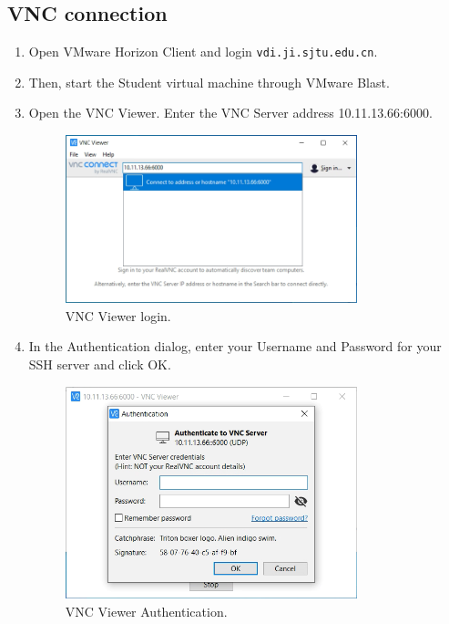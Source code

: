 \documentclass[a4paper,12pt,twoside]{article}
\begin{document}
\subsection{VNC connection}
\begin{enumerate}
    \item Open VMware Horizon Client and login \texttt{vdi.ji.sjtu.edu.cn}.
    \item Then, start the Student virtual machine through VMware Blast.
    \item Open the VNC Viewer. Enter the VNC Server address 10.11.13.66:6000.
    \begin{figure}[H]
        \centering
        \includegraphics[width=0.8\textwidth]{images/7.png}
        \caption{VNC Viewer login.}
    \end{figure}
    \item In the Authentication dialog, enter your Username and Password for your SSH server and click OK.
    \begin{figure}[H]
        \centering
        \includegraphics[width=0.8\textwidth]{images/8.png}
        \caption{VNC Viewer Authentication.}
    \end{figure}
\end{enumerate}
\end{document}
